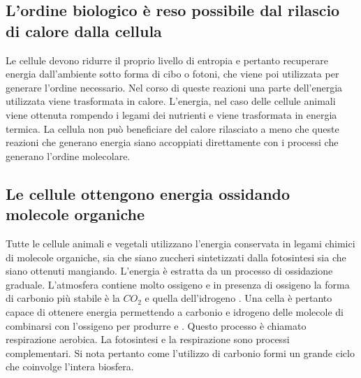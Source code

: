 \subsection{L'ordine biologico \`e reso possibile dal rilascio di calore dalla cellula}
Le cellule devono ridurre il proprio livello di entropia e pertanto recuperare energia dall'ambiente sotto forma di cibo o fotoni, che viene poi utilizzata per generare l'ordine
necessario. Nel corso di queste reazioni una parte dell'energia utilizzata viene trasformata in calore. L'energia, nel caso delle cellule animali viene ottenuta rompendo i legami dei 
nutrienti e viene trasformata in energia termica. La cellula non pu\`o beneficiare del calore rilasciato a meno che queste reazioni che generano energia siano accoppiati direttamente
con i processi che generano l'ordine molecolare. 
\subsection{Le cellule ottengono energia ossidando molecole organiche}
Tutte le cellule animali e vegetali utilizzano l'energia conservata in legami chimici di molecole organiche, sia che siano zuccheri sintetizzati dalla fotosintesi sia che siano ottenuti
mangiando. L'energia \`e estratta da un processo di ossidazione graduale. L'atmosfera contiene molto ossigeno e in presenza di ossigeno la forma di carbonio pi\`u stabile \`e la $CO_2$ e
quella dell'idrogeno . Una cella \`e pertanto capace di ottenere energia permettendo a carbonio e idrogeno delle molecole di combinarsi con l'ossigeno per produrre  e 
. Questo processo \`e chiamato respirazione aerobica. La fotosintesi e la respirazione sono processi complementari. Si nota pertanto come l'utilizzo di carbonio formi un grande 
ciclo che coinvolge l'intera biosfera. 
